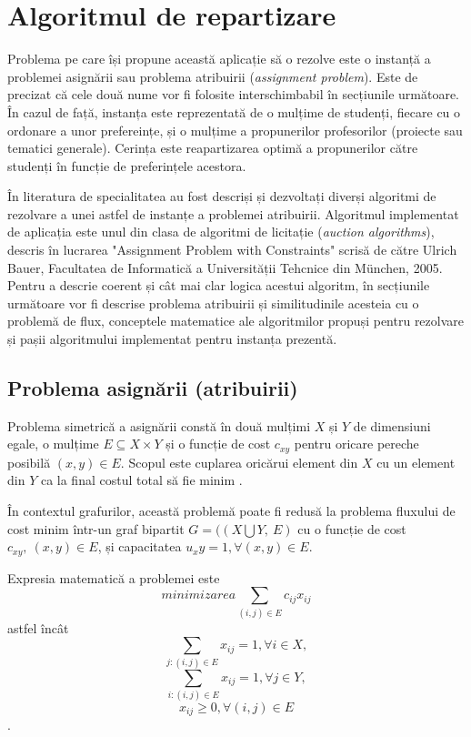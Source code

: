 \chapter{Algoritmul de repartizare}

Problema pe care își propune această aplicație să o rezolve este o instanță a problemei asignării sau problema atribuirii (\textit{assignment problem}). Este de precizat că cele două nume vor fi folosite interschimbabil în secțiunile următoare. În cazul de față, instanța este reprezentată de o mulțime de studenți, fiecare cu o ordonare a unor prefereințe, și o mulțime a propunerilor profesorilor (proiecte sau tematici generale). Cerința este reapartizarea optimă a propunerilor către studenți în funcție de preferințele acestora.

În literatura de specialitatea au fost descriși și dezvoltați diverși algoritmi de rezolvare a unei astfel de instanțe a problemei atribuirii. Algoritmul implementat de aplicația \thesistitle{} este unul din clasa de algoritmi de licitație (\textit{auction algorithms}), descris în lucrarea "Assignment Problem with Constraints" scrisă de către Ulrich Bauer, Facultatea de Informatică a Universității Tehcnice din München, 2005. Pentru a descrie coerent și cât mai clar logica acestui algoritm, în secțiunile următoare vor fi descrise problema atribuirii și similitudinile acesteia cu o problemă de flux, conceptele matematice ale algoritmilor propuși pentru rezolvare și pașii algoritmului implementat pentru instanța prezentă.

\section{Problema asignării (atribuirii)}

Problema simetrică a asignării constă în două mulțimi $X$ și $Y$ de dimensiuni egale, o mulțime $E \subseteq X \times Y$ și o funcție de cost $c_{xy}$ pentru oricare pereche posibilă $(x, y) \in E$. Scopul este cuplarea oricărui element din $X$ cu un element din $Y$ ca la final costul total să fie minim \cite{assignment}.

În contextul grafurilor, această problemă poate fi redusă la problema fluxului de cost minim într-un  graf bipartit $G=((X \bigcup Y,\ E)$ cu o funcție de cost $c_{xy},\ (x, y) \in E$, și capacitatea $u_xy = 1, \forall (x, y) \in E$. 

Expresia matematică a problemei \cite[p.~6]{assignment} este 
\[ minimizarea \sum_{(i, j) \in E} c_{ij} x_{ij} \]
astfel încât
\[ \sum_{j:(i, j) \in E} x_{ij} = 1, \forall i \in X, \]
\[ \sum_{i:(i, j) \in E} x_{ij} = 1, \forall j \in Y, \]
\[ x_{ij} \geq 0, \forall (i, j) \in E \].

